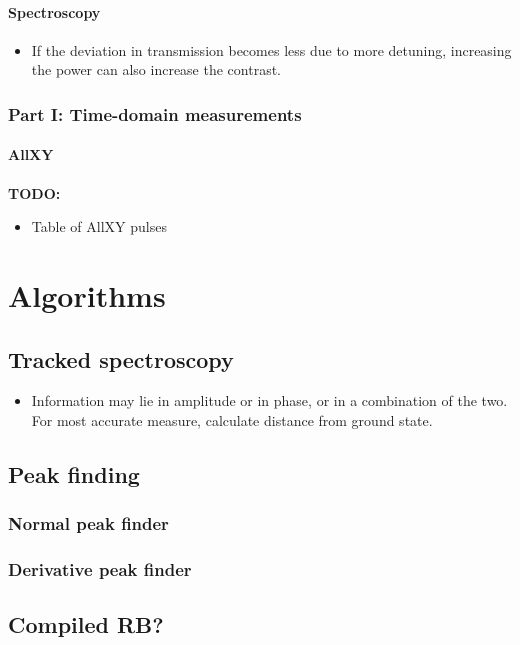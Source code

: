     \subsubsection{Spectroscopy}
      \begin{itemize}
        \item If the deviation in transmission becomes less due to more detuning, increasing the power can also increase the contrast.
      \end{itemize}
  \subsection{Part I: Time-domain measurements}
    \subsubsection{AllXY}
      \textbf{TODO:}
      \begin{itemize}
        \item Table of AllXY pulses
      \end{itemize}
\chapter{Algorithms}
\section{Tracked spectroscopy}
\label{sec:Tracked spectroscopy}
  \begin{itemize}
    \item Information may lie in amplitude or in phase, or in a combination of the two. For most accurate measure, calculate distance from ground state.
  \end{itemize}
\section{Peak finding}
  \subsection{Normal peak finder}
  \subsection{Derivative peak finder}
\section{Compiled RB?}